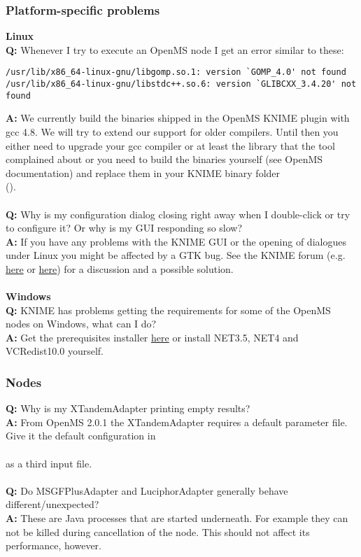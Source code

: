 \subsubsection{Platform-specific problems}
\textbf{Linux}\\
\textbf{Q:} Whenever I try to execute an OpenMS node I get an error similar to these:
\begin{verbatim}
/usr/lib/x86_64-linux-gnu/libgomp.so.1: version `GOMP_4.0' not found
/usr/lib/x86_64-linux-gnu/libstdc++.so.6: version `GLIBCXX_3.4.20' not found
\end{verbatim}
\textbf{A:} We currently build the binaries shipped in the OpenMS KNIME plugin with gcc 4.8. We will try to extend our support for older compilers.
Until then you either need to upgrade your gcc compiler
or at least the library that the tool complained about or you need to build the
binaries yourself (see OpenMS documentation) and replace them in your KNIME binary folder\\
().
\\\\
\textbf{Q:} Why is my configuration dialog closing right away when I double-click or try to configure it? Or why is my GUI responding so slow?\\
\textbf{A:} If you have any problems with the KNIME GUI or the opening of dialogues under Linux you might be affected by a
GTK bug. See the KNIME forum (e.g. \href{https://tech.knime.org/forum/knime-general/ubuntu-1604-slow-performance}{here} or \href{https://tech.knime.org/forum/knime-users/knime-300-crashes-after-splash-screen}{here}) for a discussion and a possible solution.\\\\
\textbf{Windows}\\
\textbf{Q:} KNIME has problems getting the requirements for some of the OpenMS nodes on Windows, what can I do?\\
\textbf{A:} Get the prerequisites installer \href{\WindowsPrerequisitesLink}{here} or install NET3.5, NET4 and VCRedist10.0 yourself.\\
\subsubsection{Nodes}
\textbf{Q:} Why is my XTandemAdapter printing empty results?\\
\textbf{A:} From OpenMS 2.0.1 the XTandemAdapter requires a default parameter file. Give it the default configuration in\\
\\
 as a third input file.
\\\\
\textbf{Q:} Do MSGFPlusAdapter and LuciphorAdapter generally behave different/unexpected?\\
\textbf{A:} These are Java processes that are started underneath. For example they can not be killed during cancellation of the node.
This should not affect its performance, however.
